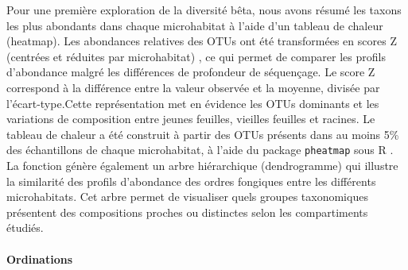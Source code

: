 \documentclass[a4paper,12pt]{article}
\begin{document}
Pour une première exploration de la diversité bêta, nous avons résumé les taxons les plus abondants dans chaque microhabitat à l’aide d’un tableau de chaleur (heatmap). Les abondances relatives des OTUs ont été transformées en scores Z (centrées et réduites par microhabitat) \citep{altman1991practical}, ce qui permet de comparer les profils d’abondance malgré les différences de profondeur de séquençage. Le score Z correspond à la différence entre la valeur observée et la moyenne, divisée par l’écart-type.Cette représentation met en évidence les OTUs dominants et les variations de composition entre jeunes feuilles, vieilles feuilles et racines. Le tableau de chaleur a été construit à partir des OTUs présents dans au moins 5\% des échantillons de chaque microhabitat, à l’aide du package \texttt{pheatmap} sous R \citep{kolde2019pheatmap}. 
La fonction génère également un arbre hiérarchique (dendrogramme) qui illustre la similarité des profils d’abondance des ordres fongiques entre les différents microhabitats. Cet arbre permet de visualiser quels groupes taxonomiques présentent des compositions proches ou distinctes selon les compartiments étudiés.

\paragraph{Ordinations}
\end{document}
